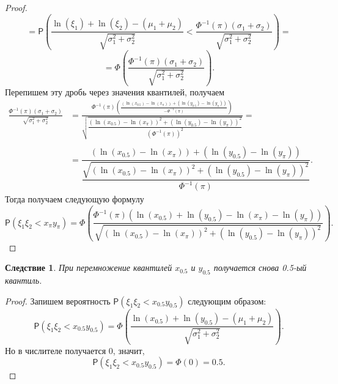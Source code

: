 \documentclass[specialist, substylefile = spbu.rtx,
subf,href,colorlinks=true, 12pt]{disser}
\newtheorem{corollary}[theorem]{Следствие}
\begin{document}
\begin{proof}
		\begin{equation*}
			=\mathsf{P}\left(\displaystyle{\frac{\ln(\xi_{1})+\ln(\xi_{2})-(\mu_{1}+\mu_{2})}{\sqrt{\sigma_{1}^{2}+\sigma_{2}^{2}}}}<\displaystyle{\frac{\Phi^{-1}(\pi)(\sigma_{1}+\sigma_{2})}{\sqrt{\sigma_{1}^{2}+\sigma_{2}^{2}}}}\right)=
		\end{equation*}
		\begin{equation*}
			=\Phi\left(\frac{\Phi^{-1}(\pi)(\sigma_{1}+\sigma_{2})}{\sqrt{\sigma_{1}^{2}+\sigma_{2}^{2}}}\right).
		\end{equation*}
		Перепишем эту дробь через значения квантилей, получаем
		\begin{align*}
			\frac{\Phi^{-1}(\pi)(\sigma_{1}+\sigma_{2})}{\sqrt{\sigma_{1}^{2}+\sigma_{2}^{2}}} &= \frac{\Phi^{-1}(\pi)\left(\displaystyle{\frac{(\ln(x_{0.5})-\ln(x_{\pi}))+(\ln(y_{0.5})-\ln(y_{\pi}))}{-\Phi^{-1}(\pi)}}\right)}{\sqrt{\dfrac{(\ln(x_{0.5})-\ln(x_{\pi}))^{2}+(\ln(y_{0.5})-\ln(y_{\pi}))^{2}}{(\Phi^{-1}(\pi))^{2}}}}=\\\\
			&=\dfrac{(\ln(x_{0.5})-\ln(x_{\pi}))+(\ln(y_{0.5})-\ln(y_{\pi}))}{\dfrac{\sqrt{(\ln(x_{0.5})-\ln(x_{\pi}))^{2}+(\ln(y_{0.5})-\ln(y_{\pi}))^{2}}}{\Phi^{-1}(\pi)}}.
		\end{align*}
		Тогда получаем следующую формулу
		\begin{equation*}
			\mathsf{P}(\xi_{1}\xi_{2}< x_{\pi}y_{\pi}) =\Phi\left(\frac{\Phi^{-1}(\pi)(\ln(x_{0.5})+\ln(y_{0.5})-\ln(x_{\pi})-\ln(y_{\pi}))}{\sqrt{(\ln(x_{0.5})-\ln(x_{\pi}))^{2}+(\ln(y_{0.5})-\ln(y_{\pi}))^{2}}}\right).
		\end{equation*}
	\end{proof}
	
	\begin{corollary}\label{pr9}
		При перемножение квантилей $x_{0.5}$ и $y_{0.5}$ получается снова 0.5-ый квантиль.   
	\end{corollary}
	\begin{proof}
		Запишем вероятность $\mathsf{P}(\xi_{1} \xi_{2} < x_{0.5}y_{0.5})$ следующим образом:
		\begin{equation*}
			\mathsf{P}(\xi_{1} \xi_{2} < x_{0.5}y_{0.5}) =\Phi\left( \dfrac{\ln(x_{0.5})+\ln(y_{0.5}) - (\mu_{1}+\mu_{2})}{\sqrt{\sigma_{1}^{2}+\sigma_{2}^{2}}}\right).
		\end{equation*}
		Но в числителе получается 0, значит,
		\begin{equation*}
			\mathsf{P}(\xi_{1} \xi_{2} < x_{0.5}y_{0.5}) = \Phi(0) = 0.5.
		\end{equation*} 
	\end{proof}
	
\end{document}

